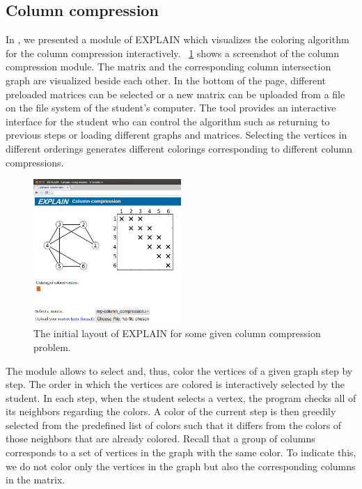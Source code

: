 \documentclass[12pt, twoside,a4paper,toc=bibliography]{scrbook}
\begin{document}
\subsection{Column compression}
\label{s.column-compression}
In \cite{2013:05,2014:01}, we presented a module of \mbox{EXPLAIN} which visualizes the
coloring algorithm for the column compression interactively.
\figurename~\ref{fig1} shows a screenshot of the column compression module. 
The matrix and the corresponding column intersection graph are visualized beside each other.
In the bottom of the page, different preloaded matrices can be selected 
or a new matrix can be uploaded from a file on the file system of the student's computer. 
The tool provides an interactive interface for the student who can control the algorithm
such as returning to previous steps or loading different graphs and matrices. 
Selecting the vertices in different orderings generates different colorings corresponding to different column compressions.

\begin{figure}
\centering
\includegraphics[width=0.5\textwidth]{fig1.png}
\caption{The initial layout of EXPLAIN for some given column compression problem.}
\label{fig1}
\end{figure}
The module allows to select and, thus, color the vertices of a given graph step by step. The order in which the vertices are colored is interactively selected by the student. In each step, when the student selects a vertex, the program checks all of its neighbors regarding the colors. A color of the current step is then greedily selected from the predefined list of colors such that it differs from the colors of those neighbors that are already colored. Recall that a group of columns corresponds to a set of vertices in the graph with the same color. To indicate this, we do not color only the vertices in the graph but also the corresponding columns in the matrix.
\end{document}
